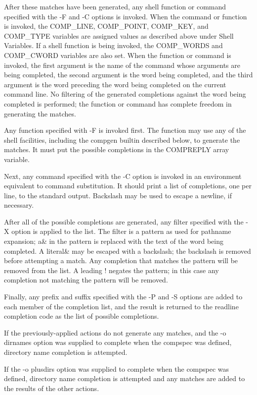 After these matches have been generated, any shell function or command specified with the -F and -C options is invoked. When the command or function is invoked, the COMP\_LINE, COMP\_POINT, COMP\_KEY, and COMP\_TYPE variables are assigned values as described above under Shell Variables. If a shell function is being invoked, the COMP\_WORDS and COMP\_CWORD variables are also set. When the function or command is invoked, the first argument is the name of the command whose arguments are being completed, the second argument is the word being completed, and the third argument is the word preceding the word being completed on the current command line. No filtering of the generated completions against the word being completed is performed; the function or command has complete freedom in generating the matches.

Any function specified with -F is invoked first. The function may use any of the shell facilities, including the compgen builtin described below, to generate the matches. It must put the possible completions in the COMPREPLY array variable.

Next, any command specified with the -C option is invoked in an environment equivalent to command substitution. It should print a list of completions, one per line, to the standard output. Backslash may be used to escape a newline, if necessary.

After all of the possible completions are generated, any filter specified with the -X option is applied to the list. The filter is a pattern as used for pathname expansion; a\& in the pattern is replaced with the text of the word being completed. A literal\& may be escaped with a backslash; the backslash is removed before attempting a match. Any completion that matches the pattern will be removed from the list. A leading ! negates the pattern; in this case any completion not matching the pattern will be removed.

Finally, any prefix and suffix specified with the -P and -S options are added to each member of the completion list, and the result is returned to the readline completion code as the list of possible completions.

If the previously-applied actions do not generate any matches, and the -o dirnames option was supplied to complete when the compspec was defined, directory name completion is attempted.

If the -o plusdirs option was supplied to complete when the compspec was defined, directory name completion is attempted and any matches are added to the results of the other actions.

